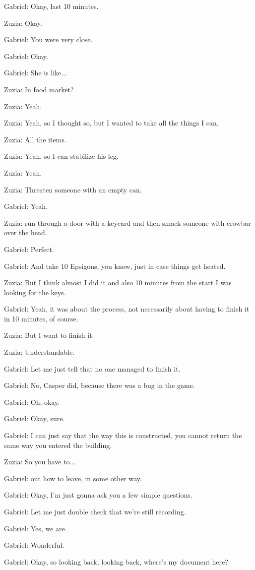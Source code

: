 Gabriel: Okay, last 10 minutes.

Zuzia: Okay.

Gabriel: You were very close.

Gabriel: Okay.

Gabriel: She is like...

Zuzia: In food market?

Zuzia: Yeah.

Zuzia: Yeah, so I thought so, but I wanted to take all the things I can.

Zuzia: All the items.

Zuzia: Yeah, so I can stabilize his leg.

Zuzia: Yeah.

Zuzia: Threaten someone with an empty can.

Gabriel: Yeah.

Zuzia: run through a door with a keycard and then smack someone with crowbar over the head.

Gabriel: Perfect.

Gabriel: And take 10 Epsigons, you know, just in case things get heated.

Zuzia: But I think almost I did it and also 10 minutes from the start I was looking for the keys.

Gabriel: Yeah, it was about the process, not necessarily about having to finish it in 10 minutes, of course.

Zuzia: But I want to finish it.

Zuzia: Understandable.

Gabriel: Let me just tell that no one managed to finish it.

Gabriel: No, Casper did, because there was a bug in the game.

Gabriel: Oh, okay.

Gabriel: Okay, sure.

Gabriel: I can just say that the way this is constructed, you cannot return the same way you entered the building.

Zuzia: So you have to...

Gabriel: out how to leave, in some other way.

Gabriel: Okay, I'm just gonna ask you a few simple questions.

Gabriel: Let me just double check that we're still recording.

Gabriel: Yes, we are.

Gabriel: Wonderful.

Gabriel: Okay, so looking back, looking back, where's my document here?

